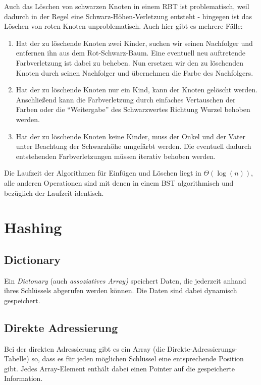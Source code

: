 \documentclass[12pt]{article}
\begin{document}
Auch das Löschen von schwarzen Knoten in einem RBT ist problematisch, weil dadurch in der Regel eine Schwarz-Höhen-Verletzung entsteht - hingegen ist das Löschen von roten Knoten unproblematisch. Auch hier gibt es mehrere Fälle:

\begin{enumerate}
\item Hat der zu löschende Knoten zwei Kinder, suchen wir seinen Nachfolger und entfernen ihn aus dem Rot-Schwarz-Baum. Eine eventuell neu auftretende Farbverletzung ist dabei zu beheben. Nun ersetzen wir den zu löschenden Knoten durch seinen Nachfolger und übernehmen die Farbe des Nachfolgers.
\item Hat der zu löschende Knoten nur ein Kind, kann der Knoten gelöscht werden. Anschließend kann die Farbverletzung durch einfaches Vertauschen der Farben oder die \enquote{Weitergabe} des Schwarzwertes Richtung Wurzel behoben werden.
\item Hat der zu löschende Knoten keine Kinder, muss der Onkel und der Vater unter Beachtung der Schwarzhöhe umgefärbt werden. Die eventuell dadurch entstehenden Farbverletzungen müssen iterativ behoben werden.
\end{enumerate}

Die Laufzeit der Algorithmen für Einfügen und Löschen liegt in $\Theta(\log(n))$, alle anderen Operationen sind mit denen in einem BST algorithmisch und bezüglich der Laufzeit identisch.

\section{Hashing}

\subsection{Dictionary}

Ein \textit{Dictonary} (auch \textit{assoziatives Array)} speichert Daten, die jederzeit anhand ihres Schlüssels abgerufen werden können. Die Daten sind dabei dynamisch gespeichert.

\subsection{Direkte Adressierung}

Bei der direkten Adressierung gibt es ein Array (die Direkte-Adressierungs-Tabelle) so, dass es für jeden möglichen Schlüssel eine entsprechende Position gibt. Jedes Array-Element enthält dabei einen Pointer auf die gespeicherte Information.
\end{document}
